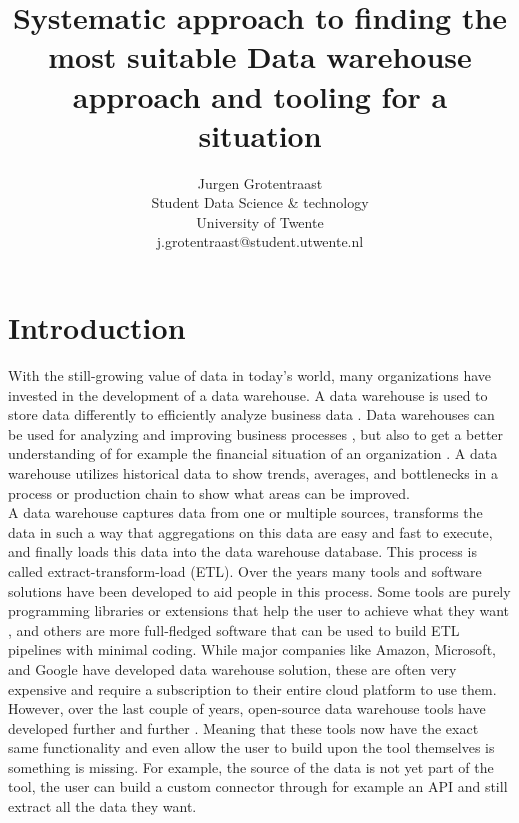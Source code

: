 \documentclass[11pt]{article}
\title{Systematic approach to finding the most suitable Data warehouse approach and tooling for a situation}
\author{Jurgen Grotentraast \\
  Student Data Science \& technology\\
  University of Twente \\
  j.grotentraast@student.utwente.nl\\}
\begin{document}
{\makeatletter\acl@finalcopytrue
  \maketitle
}

\section{Introduction}
With the still-growing value of data in today's world, many organizations have invested in the development of a data warehouse. A data warehouse is used to store data differently to efficiently analyze business data \cite{gupta1997selection}. Data warehouses can be used for analyzing and improving business processes \cite{shahzad2009goal}, but also to get a better understanding of for example the financial situation of an organization \cite{lapura2018development}. A data warehouse utilizes historical data to show trends, averages, and bottlenecks in a process or production chain to show what areas can be improved. \\

A data warehouse captures data from one or multiple sources, transforms the data in such a way that aggregations on this data are easy and fast to execute, and finally loads this data into the data warehouse database. This process is called extract-transform-load (ETL). Over the years many tools and software solutions have been developed to aid people in this process. Some tools are purely programming libraries or extensions that help the user to achieve what they want \cite{Thomsen201821, Jensen202145, Biswas_programming2019267}, and others are more full-fledged software that can be used to build ETL pipelines with minimal coding. While major companies like Amazon, Microsoft, and Google have developed data warehouse solution, these are often very expensive and require a subscription to their entire cloud platform to use them. However, over the last couple of years, open-source data warehouse tools have developed further and further \cite{nejres2015analysis}. Meaning that these tools now have the exact same functionality and even allow the user to build upon the tool themselves is something is missing. For example, the source of the data is not yet part of the tool, the user can build a custom connector through for example an API and still extract all the data they want. \\
\end{document}
